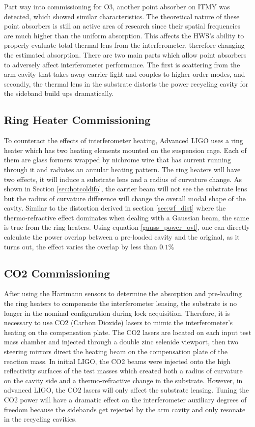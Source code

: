 	Part way into commissioning for O3, another point absorber on ITMY was detected, which showed similar characteristics.  The theoretical nature of these point absorbers is still an active area of research since their spatial frequencies are much higher than the uniform absorption.  This affects the HWS's ability to properly evaluate total thermal lens from the interferometer, therefore changing the estimated absorption.  There are two main parts which allow point absorbers to adversely affect interferometer performance.   The first is scattering from the arm cavity that takes away carrier light and couples to higher order modes, and secondly, the thermal lens in the substrate distorts the power recycling cavity for the sideband build ups dramatically.
	
	\subsection{Ring Heater Commissioning}\label{Sec:RH}
	To counteract the effects of interferometer heating, Advanced LIGO uses a ring heater \cite{ramette_analytical} \cite{wang_thermalmodel} which has two heating elements mounted on the suspension cage. Each of them are glass formers wrapped by nichrome wire that has current running through it and radiates an annular heating pattern. The ring heaters will have two effects, it will induce a substrate lens and a radius of curvature change.  As shown in Section \ref{sec:hotcoldifo}, the carrier beam will not see the substrate lens but the radius of curvature difference will change the overall modal shape of the cavity.  Similar to the distortion derived in section \ref{sec:wf_dist} where the thermo-refractive effect dominates when dealing with a Gaussian beam, the same is true from the ring heaters. Using equation \ref{gauss_power_ovl}, one can directly calculate the power overlap between a pre-loaded cavity and the original, as it turns out, the effect varies the overlap by less than $0.1\%$

	\subsection{CO2 Commissioning}\label{Sec:CO2}
	After using the Hartmann sensors to determine the absorption and pre-loading the ring heaters to compensate the interferometer lensing, the substrate is no longer in the nominal configuration during lock acquisition.  Therefore, it is necessary to use CO2 (Carbon Dioxide) lasers to mimic the interferometer's heating on the compensation plate.  The CO2 lasers are located on each input test mass chamber and injected through a double zinc selenide viewport, then two steering mirrors direct the heating beam on the compensation plate of the reaction mass.  In initial LIGO, the CO2 beams were injected onto the high reflectivity surfaces of the test masses which created both a radius of curvature on the cavity side and a thermo-refractive change in the substrate.  However, in advanced LIGO, the CO2 lasers will only affect the substrate lensing.  Tuning the CO2 power will have a dramatic effect on the interferometer auxiliary degrees of freedom because the sidebands get rejected by the arm cavity and only resonate in the recycling cavities.
	
